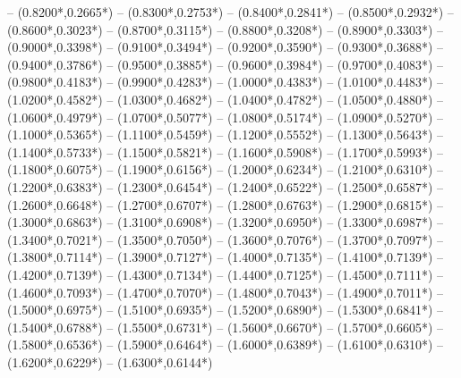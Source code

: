 {	-- ({0.8200*\dx},{0.2665*\dy})
	-- ({0.8300*\dx},{0.2753*\dy})
	-- ({0.8400*\dx},{0.2841*\dy})
	-- ({0.8500*\dx},{0.2932*\dy})
	-- ({0.8600*\dx},{0.3023*\dy})
	-- ({0.8700*\dx},{0.3115*\dy})
	-- ({0.8800*\dx},{0.3208*\dy})
	-- ({0.8900*\dx},{0.3303*\dy})
	-- ({0.9000*\dx},{0.3398*\dy})
	-- ({0.9100*\dx},{0.3494*\dy})
	-- ({0.9200*\dx},{0.3590*\dy})
	-- ({0.9300*\dx},{0.3688*\dy})
	-- ({0.9400*\dx},{0.3786*\dy})
	-- ({0.9500*\dx},{0.3885*\dy})
	-- ({0.9600*\dx},{0.3984*\dy})
	-- ({0.9700*\dx},{0.4083*\dy})
	-- ({0.9800*\dx},{0.4183*\dy})
	-- ({0.9900*\dx},{0.4283*\dy})
	-- ({1.0000*\dx},{0.4383*\dy})
	-- ({1.0100*\dx},{0.4483*\dy})
	-- ({1.0200*\dx},{0.4582*\dy})
	-- ({1.0300*\dx},{0.4682*\dy})
	-- ({1.0400*\dx},{0.4782*\dy})
	-- ({1.0500*\dx},{0.4880*\dy})
	-- ({1.0600*\dx},{0.4979*\dy})
	-- ({1.0700*\dx},{0.5077*\dy})
	-- ({1.0800*\dx},{0.5174*\dy})
	-- ({1.0900*\dx},{0.5270*\dy})
	-- ({1.1000*\dx},{0.5365*\dy})
	-- ({1.1100*\dx},{0.5459*\dy})
	-- ({1.1200*\dx},{0.5552*\dy})
	-- ({1.1300*\dx},{0.5643*\dy})
	-- ({1.1400*\dx},{0.5733*\dy})
	-- ({1.1500*\dx},{0.5821*\dy})
	-- ({1.1600*\dx},{0.5908*\dy})
	-- ({1.1700*\dx},{0.5993*\dy})
	-- ({1.1800*\dx},{0.6075*\dy})
	-- ({1.1900*\dx},{0.6156*\dy})
	-- ({1.2000*\dx},{0.6234*\dy})
	-- ({1.2100*\dx},{0.6310*\dy})
	-- ({1.2200*\dx},{0.6383*\dy})
	-- ({1.2300*\dx},{0.6454*\dy})
	-- ({1.2400*\dx},{0.6522*\dy})
	-- ({1.2500*\dx},{0.6587*\dy})
	-- ({1.2600*\dx},{0.6648*\dy})
	-- ({1.2700*\dx},{0.6707*\dy})
	-- ({1.2800*\dx},{0.6763*\dy})
	-- ({1.2900*\dx},{0.6815*\dy})
	-- ({1.3000*\dx},{0.6863*\dy})
	-- ({1.3100*\dx},{0.6908*\dy})
	-- ({1.3200*\dx},{0.6950*\dy})
	-- ({1.3300*\dx},{0.6987*\dy})
	-- ({1.3400*\dx},{0.7021*\dy})
	-- ({1.3500*\dx},{0.7050*\dy})
	-- ({1.3600*\dx},{0.7076*\dy})
	-- ({1.3700*\dx},{0.7097*\dy})
	-- ({1.3800*\dx},{0.7114*\dy})
	-- ({1.3900*\dx},{0.7127*\dy})
	-- ({1.4000*\dx},{0.7135*\dy})
	-- ({1.4100*\dx},{0.7139*\dy})
	-- ({1.4200*\dx},{0.7139*\dy})
	-- ({1.4300*\dx},{0.7134*\dy})
	-- ({1.4400*\dx},{0.7125*\dy})
	-- ({1.4500*\dx},{0.7111*\dy})
	-- ({1.4600*\dx},{0.7093*\dy})
	-- ({1.4700*\dx},{0.7070*\dy})
	-- ({1.4800*\dx},{0.7043*\dy})
	-- ({1.4900*\dx},{0.7011*\dy})
	-- ({1.5000*\dx},{0.6975*\dy})
	-- ({1.5100*\dx},{0.6935*\dy})
	-- ({1.5200*\dx},{0.6890*\dy})
	-- ({1.5300*\dx},{0.6841*\dy})
	-- ({1.5400*\dx},{0.6788*\dy})
	-- ({1.5500*\dx},{0.6731*\dy})
	-- ({1.5600*\dx},{0.6670*\dy})
	-- ({1.5700*\dx},{0.6605*\dy})
	-- ({1.5800*\dx},{0.6536*\dy})
	-- ({1.5900*\dx},{0.6464*\dy})
	-- ({1.6000*\dx},{0.6389*\dy})
	-- ({1.6100*\dx},{0.6310*\dy})
	-- ({1.6200*\dx},{0.6229*\dy})
	-- ({1.6300*\dx},{0.6144*\dy})
}
